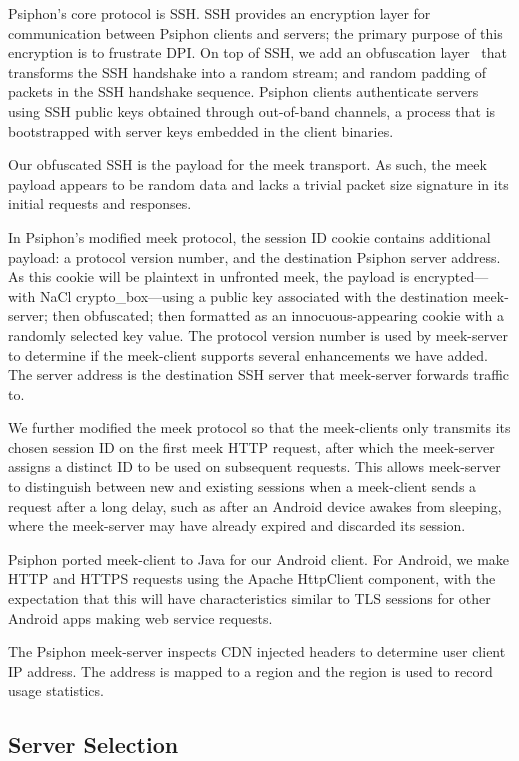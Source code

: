 \documentclass{sig-alternate}
\begin{document}
Psiphon's core protocol is SSH. SSH provides an encryption layer for
communication between Psiphon clients and servers; the primary purpose of
this encryption is to frustrate DPI. On top of SSH, we add an obfuscation
layer~\cite{obfuscated-openssh} that transforms the SSH handshake into a random stream; and
random padding of packets in the SSH handshake sequence. Psiphon clients
authenticate servers using SSH public keys obtained through out-of-band
channels, a process that is bootstrapped with server keys embedded in the
client binaries.

Our obfuscated SSH is the payload for the meek transport. As such, the meek
payload appears to be random data and lacks a trivial packet size signature
in its initial requests and responses.

In Psiphon's modified meek protocol, the session ID cookie contains
additional payload: a protocol version number, and the destination Psiphon
server address. As this cookie will be plaintext in unfronted meek, the
payload is encrypted---with NaCl crypto\_box---using a public key
associated with the destination meek-server; then obfuscated; then
formatted as an innocuous-appearing cookie with a randomly selected key
value. The protocol version number is used by meek-server to determine if
the meek-client supports several enhancements we have added. The server
address is the destination SSH server that meek-server forwards traffic to.

We further modified the meek protocol so that the meek-clients only
transmits its chosen session ID on the first meek HTTP request, after which
the meek-server assigns a distinct ID to be used on subsequent requests.
This allows meek-server to distinguish between new and existing sessions
when a meek-client sends a request after a long delay, such as after an
Android device awakes from sleeping, where the meek-server may have already
expired and discarded its session.

Psiphon ported meek-client to Java for our Android client. For Android, we
make HTTP and HTTPS requests using the Apache HttpClient component, with
the expectation that this will have characteristics similar to TLS sessions
for other Android apps making web service requests.

The Psiphon meek-server inspects CDN injected headers to determine user
client IP address. The address is mapped to a region and the region is used
to record usage statistics.

\subsection{Server Selection}
\end{document}
